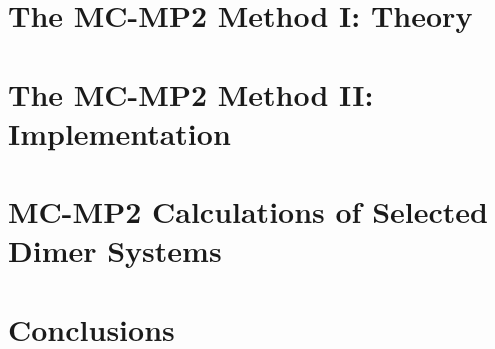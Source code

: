 \documentclass[a4paper]{report}
\begin{document}



\tableofcontents

%
%


\doublespacing



\chapter{The MC-MP2 Method I: Theory}

\chapter{The MC-MP2 Method II: Implementation}

\chapter{MC-MP2 Calculations of Selected Dimer Systems}

\chapter{Conclusions}

\printbibliography
\end{document}

